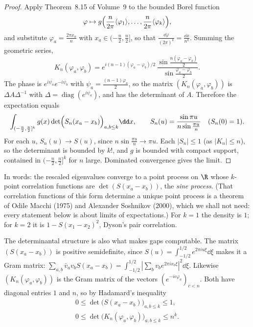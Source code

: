 \begin{proof}
Apply Theorem~8.15 of Volume~9 to the bounded Borel function
\[
\varphi\mapsto g\Bigl(\frac n{2\pi}\langle\varphi_1\rangle,\dots,\frac n{2\pi}\langle\varphi_k\rangle\Bigr),
\]
and substitute $\varphi_a=\frac{2\pi x_a}n$ with $x_a\in(-\frac n2,\frac n2]$, so that
$\frac{\dd\varphi}{(2\pi)^k}=\frac{\dd x}{n^k}$. Summing the geometric series,
\[
K_n(\varphi_a,\varphi_b)=e^{i(n-1)(\varphi_a-\varphi_b)/2}\,\frac{\sin\frac{n(\varphi_a-\varphi_b)}2}{\sin\frac{\varphi_a-\varphi_b}2}.
\]
The phase is $e^{i\psi_a}e^{-i\psi_b}$ with $\psi_a=\frac{(n-1)\varphi_a}2$, so the matrix $(K_n(\varphi_a,\varphi_b))$ is $\Delta A\Delta^{-1}$ with $\Delta=\operatorname{diag}(e^{i\psi_a})$, and has the determinant of $A$. Therefore the expectation equals
\[
\int_{(-\frac n2,\frac n2]^k}g(x)\det\Bigl(S_n(x_a-x_b)\Bigr)_{a,b\le k}\dd x,\qquad S_n(u)=\frac{\sin\pi u}{n\sin\frac{\pi u}n}\quad(S_n(0)=1).
\]
For each $u$, $S_n(u)\to S(u)$, since $n\sin\frac{\pi u}n\to\pi u$. Each $|S_n|\le1$ (as $|K_n|\le n$), so the determinant is bounded by $k!$, and $g$ is bounded with compact support, contained in $(-\frac n2,\frac n2]^k$ for $n$ large.
Dominated convergence gives the limit.
\end{proof}

In words: the rescaled eigenvalues converge to a point process on $\R$ whose $k$-point correlation functions are $\det(S(x_a-x_b))$, the \emph{sine process}. (That correlation functions of this form determine a unique point
process is a theorem of Odile Macchi (1975) and Alexander Soshnikov (2000), which we shall not need: every statement below is about limits of expectations.) For $k=1$ the density is $1$; for $k=2$ it is $1-S(x_1-x_2)^2$,
Dyson's pair correlation.

The determinantal structure is also what makes gaps computable. The matrix $(S(x_a-x_b))$ is positive semidefinite, since $S(u)=\int_{-1/2}^{1/2}e^{2\pi iu\xi}\dd\xi$ makes it a Gram matrix: $\sum_{a,b}\bar v_av_bS(x_a-x_b)=\int_{-1/2}^{1/2}|\sum_bv_be^{2\pi ix_b\xi}|^2\dd\xi$. Likewise
$(K_n(\varphi_a,\varphi_b))$ is the Gram matrix of the vectors $(e^{-ic\varphi_a})_{c<n}$. Both have diagonal entries $1$ and $n$, so by Hadamard's inequality
\begin{equation}\label{eq:detbound}
\begin{gathered}
0\le\det\bigl(S(x_a-x_b)\bigr)_{a,b\le k}\le1,\\
0\le\det\bigl(K_n(\varphi_a,\varphi_b)\bigr)_{a,b\le k}\le n^k.
\end{gathered}
\end{equation}

